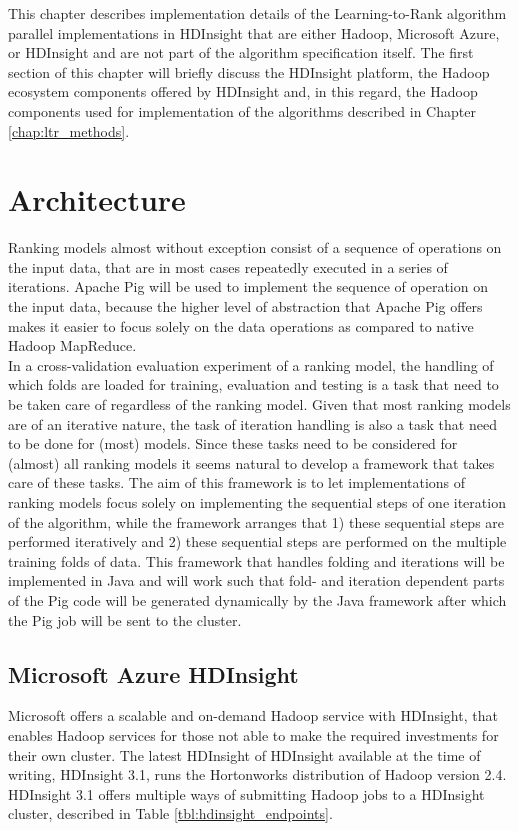 This chapter describes implementation details of the Learning-to-Rank algorithm parallel implementations in HDInsight that are either Hadoop, Microsoft Azure, or HDInsight and are not part of the algorithm specification itself. The first section of this chapter will briefly discuss the HDInsight platform, the Hadoop ecosystem components offered by HDInsight and, in this regard, the Hadoop components used for implementation of the algorithms described in Chapter \ref{chap:ltr_methods}.

\section{Architecture}
Ranking models almost without exception consist of a sequence of operations on the input data, that are in most cases repeatedly executed in a series of iterations. Apache Pig will be used to implement the sequence of operation on the input data, because the higher level of abstraction that Apache Pig offers makes it easier to focus solely on the data operations as compared to native Hadoop MapReduce.\\

In a cross-validation evaluation experiment of a ranking model, the handling of which folds are loaded for training, evaluation and testing is a task that need to be taken care of regardless of the ranking model. Given that most ranking models are of an iterative nature, the task of iteration handling is also a task that need to be done for (most) models. Since these tasks need to be considered for (almost) all ranking models it seems natural to develop a framework that takes care of these tasks. The aim of this framework is to let implementations of ranking models focus solely on implementing the sequential steps of one iteration of the algorithm, while the framework arranges that 1) these sequential steps are performed iteratively and 2) these sequential steps are performed on the multiple training folds of data. This framework that handles folding and iterations will be implemented in Java and will work such that fold- and iteration dependent parts of the Pig code will be generated dynamically by the Java framework after which the Pig job will be sent to the cluster.\\

\subsection{Microsoft Azure HDInsight}
Microsoft offers a scalable and on-demand Hadoop service with HDInsight, that enables Hadoop services for those not able to make the required investments for their own cluster. The latest HDInsight of HDInsight available at the time of writing, HDInsight 3.1, runs the Hortonworks distribution of Hadoop version 2.4. HDInsight 3.1 offers multiple ways of submitting Hadoop jobs to a HDInsight cluster, described in Table \ref{tbl:hdinsight_endpoints}.\\

